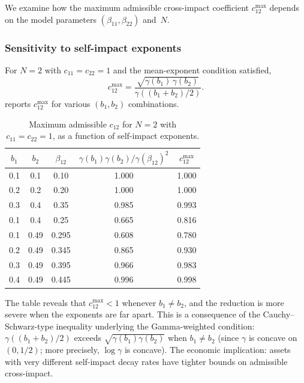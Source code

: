 \documentclass[12pt]{article}
\theoremstyle{definition}
\theoremstyle{remark}
\begin{document}
We examine how the maximum admissible cross-impact coefficient $c_{12}^{\max}$
depends on the model parameters $(\beta_{11},\beta_{22})$ and~$N$.

\subsubsection{Sensitivity to self-impact exponents}

For $N=2$ with $c_{11}=c_{22}=1$ and the mean-exponent condition satisfied,
\begin{equation}\label{eq:c12max}
  c_{12}^{\max} = \frac{\sqrt{\gamma(b_1)\,\gamma(b_2)}}{\gamma((b_1+b_2)/2)}.
\end{equation}
 reports $c_{12}^{\max}$ for various $(b_1,b_2)$ combinations.

\begin{table}[ht]
\centering
\caption{Maximum admissible $c_{12}$ for $N=2$ with $c_{11}=c_{22}=1$,
as a function of self-impact exponents.}
\label{tab:sensitivity_beta}
\begin{tabular}{cc|ccc}
\toprule
$b_1$ & $b_2$ & $\beta_{12}$ & $\gamma(b_1)\gamma(b_2)/\gamma(\beta_{12})^2$ & $c_{12}^{\max}$ \\
\midrule
0.1 & 0.1 & 0.10 & 1.000 & 1.000 \\
0.2 & 0.2 & 0.20 & 1.000 & 1.000 \\
0.3 & 0.4 & 0.35 & 0.985 & 0.993 \\
0.1 & 0.4 & 0.25 & 0.665 & 0.816 \\
0.1 & 0.49 & 0.295 & 0.608 & 0.780 \\
0.2 & 0.49 & 0.345 & 0.865 & 0.930 \\
0.3 & 0.49 & 0.395 & 0.966 & 0.983 \\
0.4 & 0.49 & 0.445 & 0.996 & 0.998 \\
\bottomrule
\end{tabular}
\end{table}

The table reveals that $c_{12}^{\max} < 1$ whenever $b_1\neq b_2$,
and the reduction is more severe when the exponents are far apart.
This is a consequence of the Cauchy--Schwarz-type inequality underlying
the Gamma-weighted condition: $\gamma((b_1+b_2)/2)$ exceeds
$\sqrt{\gamma(b_1)\gamma(b_2)}$ when $b_1\neq b_2$ (since $\gamma$ is
concave on $(0,1/2)$; more precisely, $\log\gamma$ is concave).
The economic implication: assets with very different self-impact decay rates
have tighter bounds on admissible cross-impact.
\end{document}
